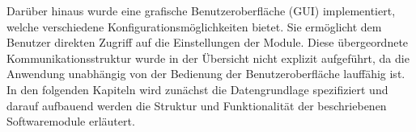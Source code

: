 Darüber hinaus wurde eine grafische Benutzeroberfläche (GUI) implementiert, welche verschiedene Konfigurationsmöglichkeiten bietet. Sie ermöglicht dem Benutzer direkten Zugriff auf die Einstellungen der Module. Diese übergeordnete Kommunikationsstruktur wurde in der Übersicht nicht explizit aufgeführt, da die Anwendung unabhängig von der Bedienung der Benutzeroberfläche lauffähig ist. In den folgenden Kapiteln wird zunächst die Datengrundlage spezifiziert und darauf aufbauend werden die Struktur und Funktionalität der beschriebenen Softwaremodule erläutert.
%
%
%
%
%
%
